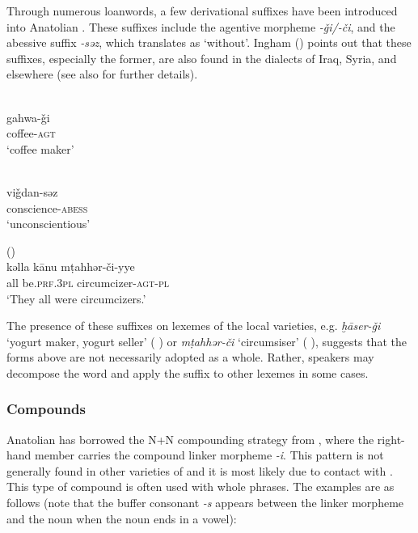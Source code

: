 \documentclass[output=paper]{langsci/langscibook}
\begin{document}
Through numerous {loanwords}, a few {derivational} suffixes have been introduced into Anatolian . These suffixes include the agentive morpheme \textit{-\v{g}i/-\v{c}i}, and the abessive suffix \textit{-səz}, which translates as `without'. Ingham (\citeyear[178]{Ingham2011afg}) points out that these suffixes, especially the former, are also found in the dialects of Iraq, Syria, and elsewhere (see also \citealt{Procházka-Eisl2018} for further details).

\ea
\ea {} 
\\ \gll gahwa-\v{g}i \\
coffee-\textsc{agt}\\
\glt `coffee maker'

\ex {}  \\
\gll vi\v{g}dan-səz \\
conscience-\textsc{abess}\\
\glt `unconscientious'

\ex {}  (\citealt[199]{Lahdo2009})\\
\gll kəlla k\={a}nu m\d{t}ahhər-\v{c}i-yye \\
all be.\textsc{prf.3pl} circumcizer-\textsc{agt-pl}\\
\glt  `They all were circumcizers.'
\z
\z


\noindent The presence of these suffixes on lexemes of the local  varieties, e.g. \textit{ḫ\={a}ser-\v{g}i} `yogurt maker, yogurt seller' ( ) or \textit{m\d{t}ahhər-\v{c}i} `circumsiser' ( ), suggests that the forms above are not necessarily adopted as a whole. Rather,  speakers may decompose the word and apply the suffix to other lexemes in some cases.

\subsubsection{Compounds}

Anatolian  has borrowed the N+N compounding strategy from , where the right-hand member carries the compound linker morpheme \textit{-i}. This pattern is not generally found in other varieties of  and it is most likely due to contact with . This type of compound is  often used with whole  phrases. The examples are as follows (note that the buffer consonant \textit{-s} appears between the linker morpheme and the noun when the noun ends in a vowel):
\end{document}
